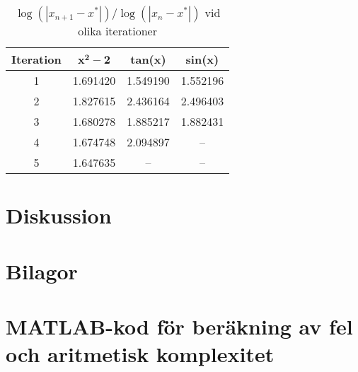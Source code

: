 \documentclass[a4paper,titlepage]{article}
\begin{document}
\begin{table}[h]
    \centering
    \label{tab:ps}
    \begin{tabular}{c | c | c | c}
        \textbf{Iteration} & $\mathbf{x^2 - 2}$ & \textbf{tan(x)} & \textbf{sin(x)} \\ \hline
        1 & 1.691420 & 1.549190 & 1.552196 \\
        2 & 1.827615 & 2.436164 & 2.496403 \\
        3 & 1.680278 & 1.885217 & 1.882431 \\
        4 & 1.674748 & 2.094897 & -- \\
        5 & 1.647635 & --       & -- \\
        
    \end{tabular}
    \caption{$\log(|x_{n + 1} - x^*|)/\log(|x_n - x^*|)$ vid olika iterationer}
\end{table}

\section{Diskussion}



\section*{Bilagor}
\appendix

\section{MATLAB-kod för beräkning av fel och aritmetisk komplexitet}
\label{sec:testcode}
\end{document}
